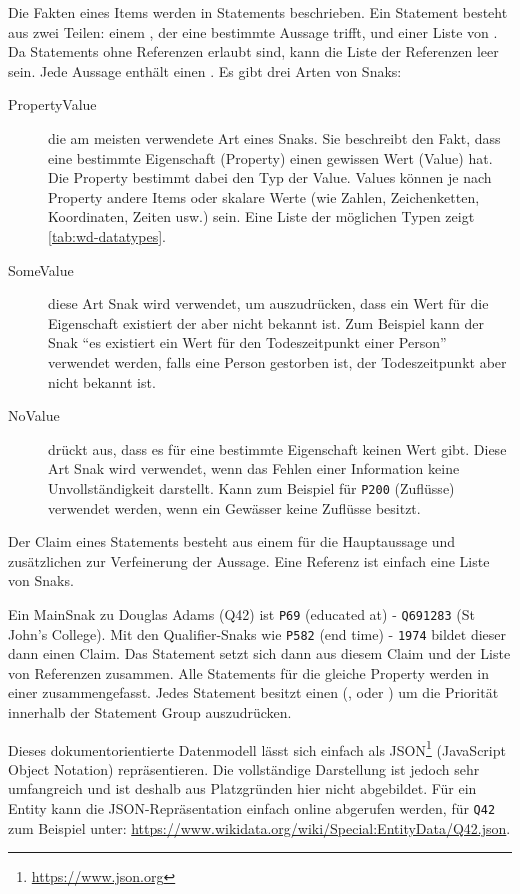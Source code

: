 Die Fakten eines Items werden in Statements beschrieben.
Ein Statement besteht aus zwei Teilen: einem , der eine bestimmte Aussage trifft, und einer Liste von .
Da Statements ohne Referenzen erlaubt sind, kann die Liste der Referenzen leer sein.
Jede Aussage enthält einen .
Es gibt drei Arten von Snaks:
\begin{description}
\item[PropertyValue] die am meisten verwendete Art eines Snaks. Sie beschreibt den Fakt, dass eine bestimmte Eigenschaft (Property) einen gewissen Wert (Value) hat. Die Property bestimmt dabei den Typ der Value. Values können je nach Property andere Items oder skalare Werte (wie Zahlen, Zeichenketten, Koordinaten, Zeiten usw.) sein. Eine Liste der möglichen Typen zeigt \cref{tab:wd-datatypes}.
\item[SomeValue] diese Art Snak wird verwendet, um auszudrücken, dass ein Wert für die Eigenschaft existiert der aber nicht bekannt ist. Zum Beispiel kann der Snak "`es existiert ein Wert für den Todeszeitpunkt einer Person"' verwendet werden, falls eine Person gestorben ist, der Todeszeitpunkt aber nicht bekannt ist.
\item[NoValue] drückt aus, dass es für eine bestimmte Eigenschaft keinen Wert gibt. Diese Art Snak wird verwendet, wenn das Fehlen einer Information keine Unvollständigkeit darstellt. Kann zum Beispiel für \verb|P200| (Zuflüsse) verwendet werden, wenn ein Gewässer keine Zuflüsse besitzt. 
\end{description}
Der Claim eines Statements besteht aus einem  für die Hauptaussage und zusätzlichen  zur Verfeinerung der Aussage.
Eine Referenz ist einfach eine Liste von Snaks. 

Ein MainSnak zu Douglas Adams (Q42) ist \verb|P69| (educated at) - \verb|Q691283| (St John's College).
Mit den Qualifier-Snaks wie \verb|P582| (end time) - \verb|1974| bildet dieser dann einen Claim.
Das Statement setzt sich dann aus diesem Claim und der Liste von Referenzen zusammen.
Alle Statements für die gleiche Property werden in einer  zusammengefasst.
Jedes Statement besitzt einen  (,  oder ) um die Priorität innerhalb der Statement Group auszudrücken.

Dieses dokumentorientierte Datenmodell lässt sich einfach als JSON\footnote{\url{https://www.json.org}} (JavaScript Object Notation) repräsentieren.
Die vollständige Darstellung ist jedoch sehr umfangreich und ist deshalb aus Platzgründen hier nicht abgebildet.
Für ein Entity kann die JSON-Repräsentation einfach online abgerufen werden, für \verb|Q42| zum Beispiel unter: \url{https://www.wikidata.org/wiki/Special:EntityData/Q42.json}.

